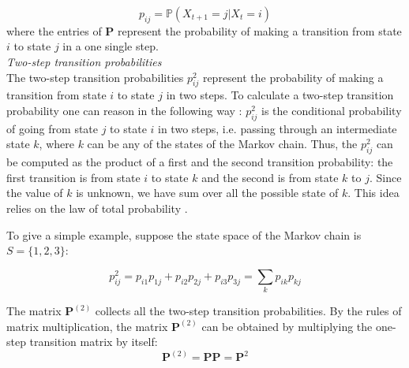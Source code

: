\documentclass[\main/main.tex]{subfiles}
\begin{document}
\begin{equation}
    p_{ij} = \mathds{P} ( X_{t+1} = j | X_t = i)
\end{equation}
where the entries of $\mathbf{P}$ represent the probability of making a transition from state $i$ to state $j$ in a one single step.\\

\noindent \textit{Two-step transition probabilities}\\
\noindent The two-step transition probabilities $p_{ij}^2$ represent the probability of making a transition from state $i$ to state $j$ in two steps. To calculate a two-step transition probability one can reason in the following way \citep{Sheskin2010}: $p_{ij}^2$ is the conditional probability of going from state $j$ to state $i$ in two steps, i.e. passing through an intermediate state $k$, where $k$ can be any of the states of the Markov chain. Thus, the $p_{ij}^2$ can be computed as the product of a first and the second transition probability: the first transition is from state $i$ to state $k$ and the second is from state $k$ to $j$. Since the value of $k$ is unknown, we have sum over all the possible state of $k$. This idea relies on the law of total probability \citep{Zwillinger2000}.

To give a simple example, suppose the state space of the Markov chain is $S = \{ 1,2,3\}$:

\begin{equation}
    p_{ij}^2 = p_{i1}p_{1j} + p_{i2}p_{2j} + p_{i3}p_{3j} = \sum_k p_{ik}p_{kj}
\end{equation}

\noindent The matrix $\mathbf{P}^{(2)}$ collects all the two-step transition probabilities. By the rules of matrix multiplication, the matrix $\mathbf{P}^{(2)}$ can be obtained by multiplying the one-step transition matrix by itself:
\begin{equation}
    \mathbf{P}^{(2)} = \mathbf{P} \mathbf{P} = \mathbf{P}^2 
\end{equation}\\
\end{document}
